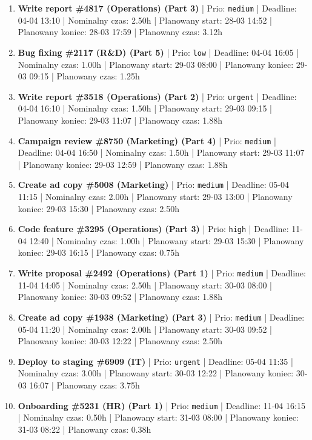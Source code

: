 {\begin{enumerate}
  \item [\textbf{14639}] \textbf{Write report \#4817 (Operations) (Part 3)} | Prio: \texttt{medium} | Deadline: 04-04 13:10 | Nominalny czas: 2.50h | Planowany start: 28-03 14:52 | Planowany koniec: 28-03 17:59 | Planowany czas: 3.12h
  \item [\textbf{14689}] \textbf{Bug fixing \#2117 (R\&D) (Part 5)} | Prio: \texttt{low} | Deadline: 04-04 16:05 | Nominalny czas: 1.00h | Planowany start: 29-03 08:00 | Planowany koniec: 29-03 09:15 | Planowany czas: 1.25h
  \item [\textbf{14598}] \textbf{Write report \#3518 (Operations) (Part 2)} | Prio: \texttt{urgent} | Deadline: 04-04 16:10 | Nominalny czas: 1.50h | Planowany start: 29-03 09:15 | Planowany koniec: 29-03 11:07 | Planowany czas: 1.88h
  \item [\textbf{14632}] \textbf{Campaign review \#8750 (Marketing) (Part 4)} | Prio: \texttt{medium} | Deadline: 04-04 16:50 | Nominalny czas: 1.50h | Planowany start: 29-03 11:07 | Planowany koniec: 29-03 12:59 | Planowany czas: 1.88h
  \item [\textbf{14666}] \textbf{Create ad copy \#5008 (Marketing)} | Prio: \texttt{medium} | Deadline: 05-04 11:15 | Nominalny czas: 2.00h | Planowany start: 29-03 13:00 | Planowany koniec: 29-03 15:30 | Planowany czas: 2.50h
  \item [\textbf{14608}] \textbf{Code feature \#3295 (Operations) (Part 3)} | Prio: \texttt{high} | Deadline: 11-04 12:40 | Nominalny czas: 1.00h | Planowany start: 29-03 15:30 | Planowany koniec: 29-03 16:15 | Planowany czas: 0.75h
  \item [\textbf{14668}] \textbf{Write proposal \#2492 (Operations) (Part 1)} | Prio: \texttt{medium} | Deadline: 11-04 14:05 | Nominalny czas: 2.50h | Planowany start: 30-03 08:00 | Planowany koniec: 30-03 09:52 | Planowany czas: 1.88h
  \item [\textbf{14652}] \textbf{Create ad copy \#1938 (Marketing) (Part 3)} | Prio: \texttt{medium} | Deadline: 05-04 11:20 | Nominalny czas: 2.00h | Planowany start: 30-03 09:52 | Planowany koniec: 30-03 12:22 | Planowany czas: 2.50h
  \item [\textbf{14597}] \textbf{Deploy to staging \#6909 (IT)} | Prio: \texttt{urgent} | Deadline: 05-04 11:35 | Nominalny czas: 3.00h | Planowany start: 30-03 12:22 | Planowany koniec: 30-03 16:07 | Planowany czas: 3.75h
  \item [\textbf{14671}] \textbf{Onboarding \#5231 (HR) (Part 1)} | Prio: \texttt{medium} | Deadline: 11-04 16:15 | Nominalny czas: 0.50h | Planowany start: 31-03 08:00 | Planowany koniec: 31-03 08:22 | Planowany czas: 0.38h

\end{enumerate}}
